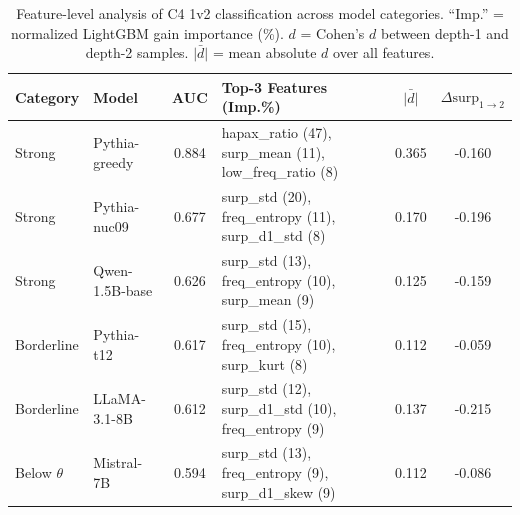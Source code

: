 \begin{table}[t]
\centering
\small
\caption{Feature-level analysis of C4 1v2 classification across model categories. ``Imp.'' = normalized LightGBM gain importance (\%). $d$ = Cohen's $d$ between depth-1 and depth-2 samples. $\bar{|d|}$ = mean absolute $d$ over all features.}
\label{tab:borderline_features}
\begin{tabular}{@{}llc lcc@{}}
\toprule
Category & Model & AUC & Top-3 Features (Imp.\%) & $\bar{|d|}$ & $\Delta\text{surp}_{1\to2}$ \\
\midrule
Strong & Pythia-greedy & 0.884 & hapax\_ratio (47), surp\_mean (11), low\_freq\_ratio (8) & 0.365 & -0.160 \\
Strong & Pythia-nuc09 & 0.677 & surp\_std (20), freq\_entropy (11), surp\_d1\_std (8) & 0.170 & -0.196 \\
Strong & Qwen-1.5B-base & 0.626 & surp\_std (13), freq\_entropy (10), surp\_mean (9) & 0.125 & -0.159 \\
\midrule
Borderline & Pythia-t12 & 0.617 & surp\_std (15), freq\_entropy (10), surp\_kurt (8) & 0.112 & -0.059 \\
Borderline & LLaMA-3.1-8B & 0.612 & surp\_std (12), surp\_d1\_std (10), freq\_entropy (9) & 0.137 & -0.215 \\
\midrule
Below $\theta$ & Mistral-7B & 0.594 & surp\_std (13), freq\_entropy (9), surp\_d1\_skew (9) & 0.112 & -0.086 \\
\bottomrule
\end{tabular}
\end{table}
